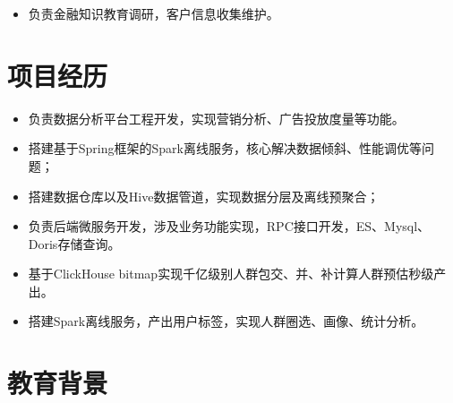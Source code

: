 \documentclass{resume}
\begin{document}
\begin{itemize}
  \item 负责金融知识教育调研，客户信息收集维护。
\end{itemize}

\section{项目经历}
\begin{itemize}
  \item 负责数据分析平台工程开发，实现营销分析、广告投放度量等功能。
  \item 搭建基于Spring框架的Spark离线服务，核心解决数据倾斜、性能调优等问题；
  \item 搭建数据仓库以及Hive数据管道，实现数据分层及离线预聚合；
  \item 负责后端微服务开发，涉及业务功能实现，RPC接口开发，ES、Mysql、Doris存储查询。
\end{itemize}

\begin{itemize}
  \item 基于ClickHouse bitmap实现千亿级别人群包交、并、补计算人群预估秒级产出。
  \item 搭建Spark离线服务，产出用户标签，实现人群圈选、画像、统计分析。
\end{itemize}

\section{教育背景}
\end{document}
